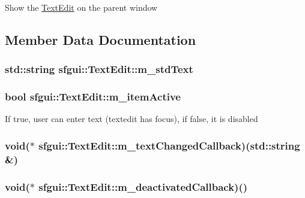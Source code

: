 Show the \hyperlink{classsfgui_1_1TextEdit}{TextEdit} on the parent window 

\subsection{Member Data Documentation}
\hypertarget{classsfgui_1_1TextEdit_08de851a32aa8dd650e33dfcb376bfd8}{
\subsubsection[m\_\-stdText]{\setlength{\rightskip}{0pt plus 5cm}std::string {\bf sfgui::TextEdit::m\_\-stdText}}}
\label{classsfgui_1_1TextEdit_08de851a32aa8dd650e33dfcb376bfd8}


\hypertarget{classsfgui_1_1TextEdit_8ffa5546b2fd4901837b13a118f9beef}{
\subsubsection[m\_\-itemActive]{\setlength{\rightskip}{0pt plus 5cm}bool {\bf sfgui::TextEdit::m\_\-itemActive}}}
\label{classsfgui_1_1TextEdit_8ffa5546b2fd4901837b13a118f9beef}


If true, user can enter text (textedit has focus), if false, it is disabled \hypertarget{classsfgui_1_1TextEdit_a6d415ef1daf7f9fdf0dec3d71cb8eab}{
\subsubsection[m\_\-textChangedCallback]{\setlength{\rightskip}{0pt plus 5cm}void($\ast$ {\bf sfgui::TextEdit::m\_\-textChangedCallback})(std::string \&)}}
\label{classsfgui_1_1TextEdit_a6d415ef1daf7f9fdf0dec3d71cb8eab}


\hypertarget{classsfgui_1_1TextEdit_bfa97d7c95f54cc91600375242fe1ea6}{
\subsubsection[m\_\-deactivatedCallback]{\setlength{\rightskip}{0pt plus 5cm}void($\ast$ {\bf sfgui::TextEdit::m\_\-deactivatedCallback})()}}
\label{classsfgui_1_1TextEdit_bfa97d7c95f54cc91600375242fe1ea6}


